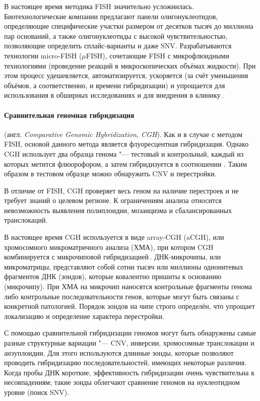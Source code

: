 \documentclass[a4paper,14pt]{extarticle}
\newcommand{\engterm}[1]{англ. \textenglish{\textit{#1}}}
\begin{document}
В настоящее время методика FISH значительно усложнилась.
Биотехнологические компании предлагают панели олигонуклеотидов, определяющие специфические участки размером от десятков тысяч до миллиона пар оснований, а также олигонуклеотиды с высокой чувствительностью, позволяющие определить сплайс-варианты и даже SNV.
Разрабатываются технологии micro-FISH ($\mu$FISH), сочетающие FISH с микрофлюидными технологиями (проведение реакций в микроскопических объёмах жидкости).
При этом процесс удешевляется, автоматизируется, ускоряется (за счёт уменьшения объёмов, а соответственно, и времени гибридизации) и упрощается для использования в обширных исследованиях и для внедрения в клинику\,\citep{Huber_2018}.

\paragraph{Сравнительная геномная гибридизация} (\engterm{Comparative Genomic Hybridization, CGH}).
Как и в случае с методом FISH, основой данного метода является флуоресцентная гибридизация.
Однако CGH использует два образца генома "--- тестовый и контрольный, каждый из которых метится флюорофором, а затем гибридизуется в соотношении .
Таким образом в тестовом образце можно обнаружить CNV и перестройки.

В отличие от FISH, CGH проверяет весь геном на наличие перестроек и не требует знаний о целевом регионе.
К ограничениям анализа относится невозможность выявления полиплоидии, мозаицизма и сбалансированных транслокаций.

В настоящее время CGH используется в виде array-CGH (aCGH), или хромосомного микроматричного анализа (ХМА), при котором CGH комбинируется с микрочиповой гибридизацией\,\citep{Theisen_2008}.
ДНК-микрочипы, или микроматрицы, представляют собой сотни тысяч или миллионы однонитевых фрагментов ДНК (зондов), которые ковалентно пришиты к основанию (микрочипу).
При ХМА на микрочип наносятся контрольные фрагменты генома либо контрольные последовательности генов, которые могут быть связаны с конкретной патологией.
Порядок зондов на чипе строго определён, что упрощает локализацию и определение характера перестройки.

С помощью сравнительной гибридизации геномов могут быть обнаружены самые разные структурные вариации "--- CNV, инверсии, хромосомные транслокации и анэуплоидии.
Для этого используются длинные зонды, которые позволяют проводить гибридизацию последовательностей, имеющих некоторые различия.
Когда пробы ДНК короткие, эффективность гибридизации очень чувствительна к несовпадениям; такие зонды облегчают сравнение геномов на нуклеотидном уровне (поиск SNV).
\end{document}
